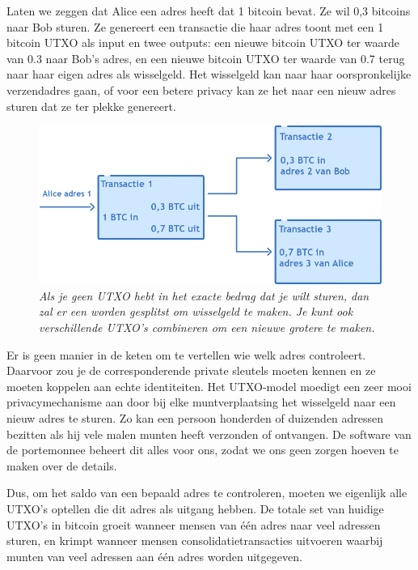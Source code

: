 \documentclass[smalldemyvopaper,11pt,twoside,onecolumn,openright,extrafontsizes]{memoir}
\begin{document}
Laten we zeggen dat Alice een adres heeft dat 1 bitcoin bevat. Ze wil 0,3 bitcoins naar Bob sturen. Ze genereert een transactie die haar adres toont met een 1 bitcoin UTXO als input en twee outputs: een nieuwe bitcoin UTXO ter waarde van 0.3 naar Bob's adres, en een nieuwe bitcoin UTXO ter waarde van 0.7 terug naar haar eigen adres als wisselgeld. Het wisselgeld kan naar haar oorspronkelijke verzendadres gaan, of voor een betere privacy kan ze het naar een nieuw adres sturen dat ze ter plekke genereert.

\begin{figure}
    \centering
    \includegraphics[width=\textwidth]{images/fig14.png}
    \caption{\footnotesize{\textit{Als je geen UTXO hebt in het exacte bedrag dat je wilt sturen, dan zal er een worden gesplitst om wisselgeld te maken. Je kunt ook verschillende UTXO's combineren om een nieuwe grotere te maken.}}}
    \label{fig14}
\end{figure}

Er is geen manier in de keten om te vertellen wie welk adres controleert. Daarvoor zou je de corresponderende private sleutels moeten kennen en ze moeten koppelen aan echte identiteiten. Het UTXO-model moedigt een zeer mooi privacymechanisme aan door bij elke muntverplaatsing het wisselgeld naar een nieuw adres te sturen. Zo kan een persoon honderden of duizenden adressen bezitten als hij vele malen munten heeft verzonden of ontvangen. De software van de portemonnee beheert dit alles voor ons, zodat we ons geen zorgen hoeven te maken over de details.

Dus, om het saldo van een bepaald adres te controleren, moeten we eigenlijk alle UTXO's optellen die dit adres als uitgang hebben. De totale set van huidige UTXO's in bitcoin groeit wanneer mensen van één adres naar veel adressen sturen, en krimpt wanneer mensen consolidatietransacties uitvoeren waarbij munten van veel adressen aan één adres worden uitgegeven.
\end{document}
